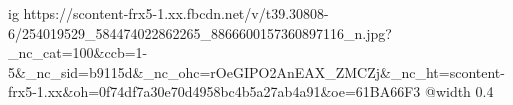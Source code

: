  
 
 
 
 

\ifcmt
  ig https://scontent-frx5-1.xx.fbcdn.net/v/t39.30808-6/254019529_584474022862265_8866600157360897116_n.jpg?_nc_cat=100&ccb=1-5&_nc_sid=b9115d&_nc_ohc=rOeGIPO2AnEAX_ZMCZj&_nc_ht=scontent-frx5-1.xx&oh=0f74df7a30e70d4958bc4b5a27ab4a91&oe=61BA66F3
  @width 0.4
\fi
